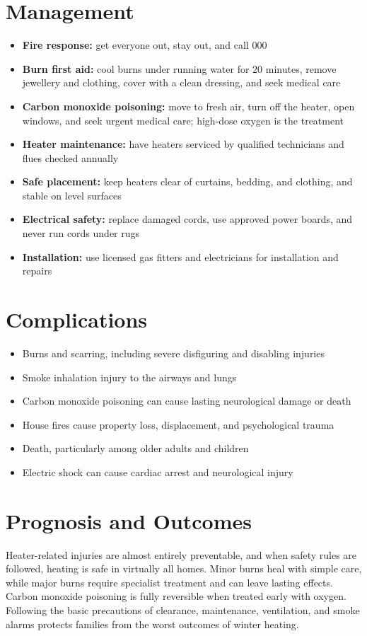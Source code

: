 \section*{Management}
\begin{itemize}
    \item \textbf{Fire response:} get everyone out, stay out, and call 000
    \item \textbf{Burn first aid:} cool burns under running water for 20 minutes, remove jewellery and clothing, cover with a clean dressing, and seek medical care
    \item \textbf{Carbon monoxide poisoning:} move to fresh air, turn off the heater, open windows, and seek urgent medical care; high-dose oxygen is the treatment
    \item \textbf{Heater maintenance:} have heaters serviced by qualified technicians and flues checked annually
    \item \textbf{Safe placement:} keep heaters clear of curtains, bedding, and clothing, and stable on level surfaces
    \item \textbf{Electrical safety:} replace damaged cords, use approved power boards, and never run cords under rugs
    \item \textbf{Installation:} use licensed gas fitters and electricians for installation and repairs
\end{itemize}

\section*{Complications}
\begin{itemize}
    \item Burns and scarring, including severe disfiguring and disabling injuries
    \item Smoke inhalation injury to the airways and lungs
    \item Carbon monoxide poisoning can cause lasting neurological damage or death
    \item House fires cause property loss, displacement, and psychological trauma
    \item Death, particularly among older adults and children
    \item Electric shock can cause cardiac arrest and neurological injury
\end{itemize}

\section*{Prognosis and Outcomes}
Heater-related injuries are almost entirely preventable, and when safety rules are followed, heating is safe in virtually all homes. Minor burns heal with simple care, while major burns require specialist treatment and can leave lasting effects. Carbon monoxide poisoning is fully reversible when treated early with oxygen. Following the basic precautions of clearance, maintenance, ventilation, and smoke alarms protects families from the worst outcomes of winter heating.

